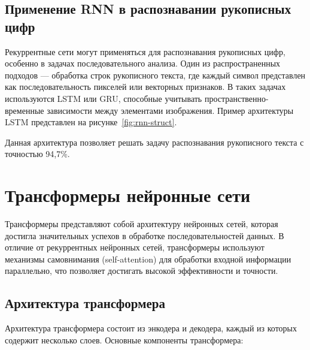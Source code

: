 \subsection{Применение RNN в распознавании рукописных цифр}
\hspace*{12.5 mm}Рекуррентные сети могут применяться для распознавания 
рукописных цифр, особенно в задачах последовательного анализа. Один из 
распространенных подходов — обработка строк рукописного текста, где каждый 
символ представлен как последовательность пикселей или векторных признаков. В 
таких задачах используются LSTM или GRU, способные учитывать 
пространственно-временные зависимости между элементами изображения. Пример 
архитектуры LSTM представлен на рисунке~\ref{fig:rnn-struct}\cite{LST2D}.


Данная архитектура позволяет решать задачу распознавания рукописного текста с 
точностью 94,7\%.

\section{Трансформеры нейронные сети}\par
\hspace*{12.5 mm}Трансформеры представляют собой архитектуру нейронных сетей, 
которая достигла значительных успехов в обработке последовательностей данных. В
отличие от рекуррентных нейронных сетей, трансформеры используют механизмы 
самовнимания (self-attention) для обработки входной информации параллельно, что 
позволяет достигать высокой эффективности и точности.

\subsection{Архитектура трансформера}
\hspace*{12.5 mm}Архитектура трансформера состоит из энкодера и декодера, 
каждый из которых содержит несколько слоев. Основные компоненты трансформера:

